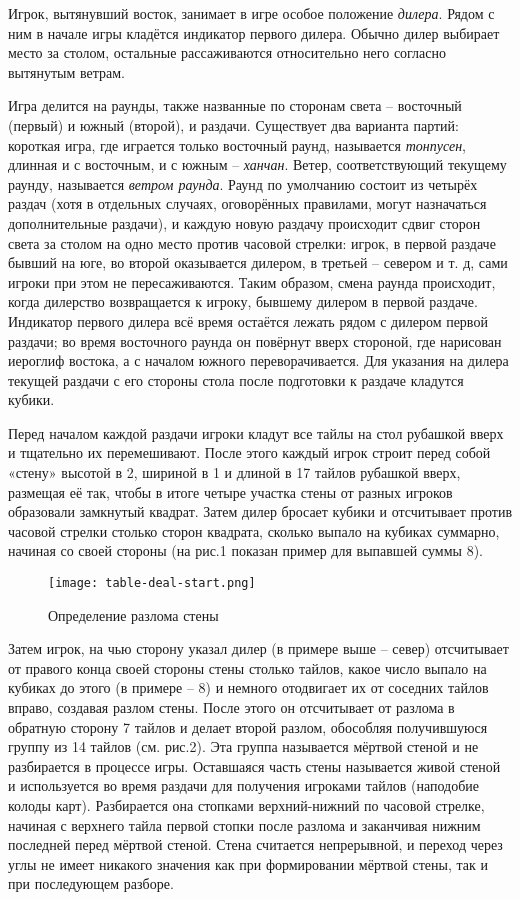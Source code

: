 Игрок, вытянувший восток, занимает в игре особое положение \textit{дилера}. Рядом с ним в начале игры кладётся индикатор первого дилера. Обычно дилер выбирает место за столом, остальные рассаживаются относительно него согласно вытянутым ветрам.

Игра делится на раунды, также названные по сторонам света – восточный (первый) и южный (второй), и раздачи. Существует два варианта партий: короткая игра, где играется только восточный раунд, называется \textit{тонпусен}, длинная и с восточным, и с южным – \textit{ханчан}. Ветер, соответствующий текущему раунду, называется \textit{ветром раунда}. Раунд по умолчанию состоит из четырёх раздач (хотя в отдельных случаях, оговорённых правилами, могут назначаться дополнительные раздачи), и каждую новую раздачу происходит сдвиг сторон света за столом на одно место против часовой стрелки: игрок, в первой раздаче бывший на юге, во второй оказывается дилером, в третьей – севером и т. д, сами игроки при этом не пересаживаются. Таким образом, смена раунда происходит, когда дилерство возвращается к игроку, бывшему дилером в первой раздаче. Индикатор первого дилера всё время остаётся лежать рядом с дилером первой раздачи; во время восточного раунда он повёрнут вверх стороной, где нарисован иероглиф востока, а с началом южного переворачивается. Для указания на дилера текущей раздачи с его стороны стола после подготовки к раздаче кладутся кубики.

Перед началом каждой раздачи игроки кладут все тайлы на стол рубашкой вверх и тщательно их перемешивают. После этого каждый игрок строит перед собой «стену» высотой в 2, шириной в 1 и длиной в 17 тайлов рубашкой вверх, размещая её так, чтобы в итоге четыре участка стены от разных игроков образовали замкнутый квадрат. Затем дилер бросает кубики и отсчитывает против часовой стрелки столько сторон квадрата, сколько выпало на кубиках суммарно, начиная со своей стороны (на рис.1 показан пример для выпавшей суммы 8).

\begin{figure}[H]
	\centering
	\texttt{[image: table-deal-start.png]}
	\caption{Определение разлома стены}
\end{figure}

Затем игрок, на чью сторону указал дилер (в примере выше – север) отсчитывает от правого конца своей стороны стены столько тайлов, какое число выпало на кубиках до этого (в примере – 8) и немного отодвигает их от соседних тайлов вправо, создавая разлом стены. После этого он отсчитывает от разлома в обратную сторону 7 тайлов и делает второй разлом, обособляя получившуюся группу из 14 тайлов (см. рис.2). Эта группа называется мёртвой стеной и не разбирается в процессе игры. Оставшаяся часть стены называется живой стеной и используется во время раздачи для получения игроками тайлов (наподобие колоды карт). Разбирается она стопками верхний-нижний по часовой стрелке, начиная с верхнего тайла первой стопки после разлома и заканчивая нижним последней перед мёртвой стеной. Стена считается непрерывной, и переход через углы не имеет никакого значения как при формировании мёртвой стены, так и при последующем разборе.

